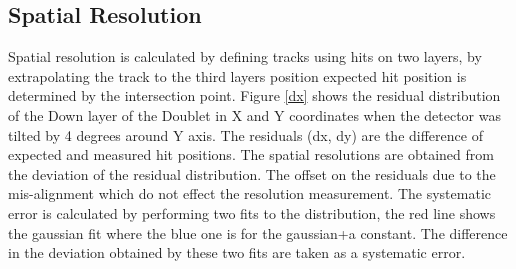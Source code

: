 \documentclass[a4paper,11pt]{article}
\begin{document}
\subsection{Spatial Resolution}
\label{sec-spa-res}
Spatial resolution is calculated by defining tracks using hits on two layers, by extrapolating the track to the third layers position expected hit position is determined by the intersection point. Figure \ref{dx} shows the residual distribution of the Down layer of the Doublet in X and Y coordinates when the detector was tilted by 4 degrees around Y axis. The residuals (dx, dy) are the difference of expected and measured hit positions. The spatial resolutions are obtained from the deviation of the residual distribution. The offset on the residuals due to the mis-alignment which do not effect the resolution measurement. The systematic error is calculated by performing two fits to the distribution, the red line shows the gaussian fit where the blue one is for the gaussian+a constant. The difference in the deviation obtained by these two fits are taken as a systematic error.
\end{document}
